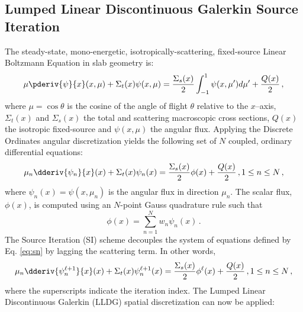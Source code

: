 
\newcommand{\rell}{^\ell}
\newcommand{\elll}{^{\ell+1}}

\subsection{Lumped Linear Discontinuous Galerkin Source Iteration}
The steady-state, mono-energetic, isotropically-scattering, fixed-source Linear Boltzmann Equation in slab geometry is: 
	\begin{equation} \label{eq:bte}
		\mu \pderiv{\psi}{x}(x, \mu) + \Sigma_t(x) \psi(x,\mu) = 
		\frac{\Sigma_s(x)}{2} \int_{-1}^{1} \psi(x, \mu') d\mu' + \frac{Q(x)}{2} \,,
	\end{equation}
where $\mu = \cos\theta$ is the cosine of the angle of flight $\theta$ relative to the $x$--axis, $\Sigma_t(x)$ and $\Sigma_s(x)$ the total and scattering macroscopic cross sections, $Q(x)$ the isotropic fixed-source and $\psi(x, \mu)$ the angular flux. Applying the Discrete Ordinates angular discretization yields the following set of $N$ coupled, ordinary differential equations: 
	\begin{equation} \label{eq:sn}
		\mu_n \dderiv{\psi_n}{x}(x) + \Sigma_t(x) \psi_n(x) = 
		\frac{\Sigma_s(x)}{2} \phi(x) + \frac{Q(x)}{2} \,, 1 \leq n \leq N \,,
	\end{equation}
where $\psi_n(x) = \psi(x, \mu_n)$ is the angular flux in direction $\mu_n$. The scalar flux, $\phi(x)$, is computed using an $N$-point Gauss quadrature rule such that 
	\begin{equation} \label{eq:phiquad}
		\phi(x) = \sum_{n=1}^N w_n \psi_n(x) \,.
	\end{equation}
The Source Iteration (SI) scheme decouples the system of equations defined by Eq. \ref{eq:sn} by lagging the scattering term. In other words, 
	\begin{equation} \label{eq:si}
		\mu_n \dderiv{\psi_n\elll}{x}(x) + \Sigma_t(x) \psi_n\elll(x) = 
		\frac{\Sigma_s(x)}{2} \phi^\ell(x) + \frac{Q(x)}{2} \,, 1 \leq n \leq N \,,
	\end{equation}
where the superscripts indicate the iteration index. The Lumped Linear Discontinuous Galerkin (LLDG) spatial discretization can now be applied: 
